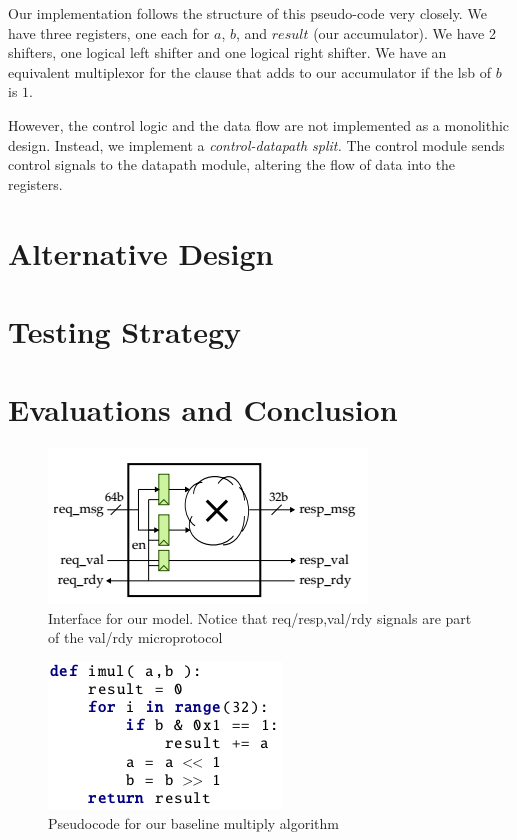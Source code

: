 \documentclass[11pt]{article}
\begin{document}
Our implementation follows the structure of this pseudo-code very closely.
We have three registers, one each for $a$, $b$, and $result$ (our accumulator).
We have 2 shifters, one logical left shifter and one logical right shifter. 
We have an equivalent multiplexor for the clause that adds to our accumulator if the lsb of $b$ is $1$.

However, the control logic and the data flow are not implemented as a monolithic design.
Instead, we implement a \textit{control-datapath split.}
The control module sends control signals to the datapath module, altering the flow of data into the registers.

  

\section{Alternative Design}

\section{Testing Strategy}

\section{Evaluations and Conclusion}

\begin{figure}
\centering
\includegraphics[scale=0.5]{FLmodel}
\caption{Interface for our model. Notice that req/resp,val/rdy signals are part of the val/rdy microprotocol}
\end{figure}

\begin{figure}
\centering
\includegraphics[scale=0.9]{imul}
\caption{Pseudocode for our baseline multiply algorithm}
\end{figure}
\end{document}
